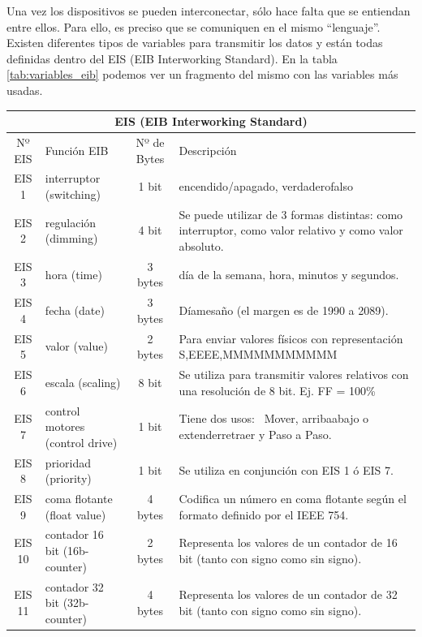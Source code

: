 Una vez los dispositivos se pueden interconectar, sólo hace falta que se entiendan entre ellos. Para ello, es preciso que se comuniquen en el mismo “lenguaje”. Existen diferentes tipos de variables para transmitir los datos y están todas definidas dentro del EIS (EIB Interworking Standard). En la tabla \ref{tab:variables_eib} podemos ver un fragmento del mismo con las variables más usadas.

\begin{table}[htbp]
\centering \scriptsize
\begin{tabular}{cp{4cm}cp{5.5cm}}
\multicolumn{4}{c}{EIS (EIB Interworking Standard)} \\ \toprule
Nº EIS& Función EIB              & Nº de Bytes &  Descripción \\ \midrule
EIS 1 & interruptor (switching)  & 1 bit & encendido/apagado, verdadero\/falso \\ \midrule
EIS 2 & regulación (dimming)     & 4 bit & Se puede utilizar de 3 formas distintas:  como interruptor, como valor relativo  y como valor absoluto. \\ \midrule
EIS 3 & hora (time)              & 3 bytes    & día de la semana, hora, minutos y segundos. \\ \midrule
EIS 4 & fecha (date)             & 3 bytes   & Día\/mes\/año (el margen es de 1990 a 2089). \\ \midrule
EIS 5 & valor (value)            & 2 bytes  & Para enviar valores físicos con representación  S,EEEE,MMMMMMMMMMM \\ \midrule
EIS 6 & escala (scaling) & 8 bit & Se utiliza para transmitir valores relativos  con una resolución de 8 bit. Ej. FF = 100\% \\ \midrule
EIS 7 & control motores (control drive) & 1 bit & Tiene dos usos: \ Mover, arriba\/abajo o extender\/retraer y Paso a Paso. \\ \midrule
EIS 8 & prioridad (priority) & 1 bit & Se utiliza en conjunción con EIS 1 ó EIS 7. \\ \midrule
EIS 9 & coma flotante (float value) & 4 bytes & Codifica un número en coma flotante  según el formato definido por el IEEE 754. \\ \midrule
EIS 10 & contador 16 bit (16b-counter) & 2 bytes & Representa los valores de un contador de 16 bit  (tanto con signo como sin signo). \\ \midrule
EIS 11 & contador 32 bit (32b-counter) & 4 bytes & Representa los valores de un contador de 32 bit  (tanto con signo como sin signo). \\ \midrule

\end{tabular}
\end{table}
